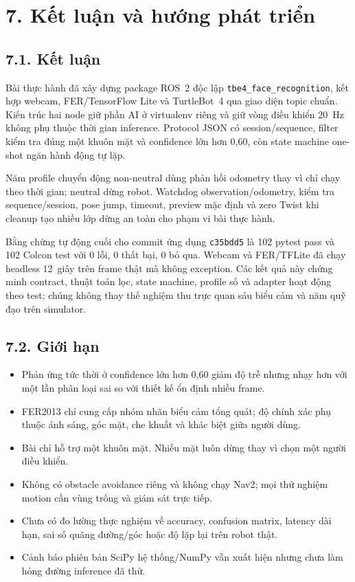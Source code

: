 \clearpage
\section*{7. Kết luận và hướng phát triển}

\subsection*{7.1. Kết luận}

Bài thực hành đã xây dựng package ROS~2 độc lập
\texttt{tbe4\_face\_recognition}, kết hợp webcam, FER/TensorFlow Lite và
TurtleBot~4 qua giao diện topic chuẩn. Kiến trúc hai node giữ phần AI ở
virtualenv riêng và giữ vòng điều khiển 20~Hz không phụ thuộc thời gian
inference. Protocol JSON có session/sequence, filter kiểm tra đúng một khuôn
mặt và confidence lớn hơn 0,60, còn state machine one-shot ngăn hành động tự
lặp.

Năm profile chuyển động non-neutral dùng phản hồi odometry thay vì chỉ chạy
theo thời gian; neutral dừng robot. Watchdog observation/odometry, kiểm tra
sequence/session, pose jump, timeout, preview mặc định và zero Twist khi
cleanup tạo nhiều lớp dừng an toàn cho phạm vi bài thực hành.

Bằng chứng tự động cuối cho commit ứng dụng \texttt{c35bdd5} là 102 pytest
pass và 102 Colcon test với 0 lỗi, 0 thất bại, 0 bỏ qua. Webcam và FER/TFLite
đã chạy headless 12~giây trên frame thật mà không exception. Các kết quả này
chứng minh contract, thuật toán lọc, state machine, profile số và adapter hoạt
động theo test; chúng không thay thế nghiệm thu trực quan sáu biểu cảm và năm
quỹ đạo trên simulator.

\subsection*{7.2. Giới hạn}

\begin{itemize}[leftmargin=1cm,itemsep=0.2em]
  \item Phản ứng tức thời ở confidence lớn hơn 0,60 giảm độ trễ nhưng nhạy hơn
        với một lần phân loại sai so với thiết kế ổn định nhiều frame.
  \item FER2013 chỉ cung cấp nhóm nhãn biểu cảm tổng quát; độ chính xác phụ
        thuộc ánh sáng, góc mặt, che khuất và khác biệt giữa người dùng.
  \item Bài chỉ hỗ trợ một khuôn mặt. Nhiều mặt luôn dừng thay vì chọn một
        người điều khiển.
  \item Không có obstacle avoidance riêng và không chạy Nav2; mọi thử nghiệm
        motion cần vùng trống và giám sát trực tiếp.
  \item Chưa có đo lường thực nghiệm về accuracy, confusion matrix, latency
        dài hạn, sai số quãng đường/góc hoặc độ lặp lại trên robot thật.
  \item Cảnh báo phiên bản SciPy hệ thống/NumPy vẫn xuất hiện nhưng chưa làm
        hỏng đường inference đã thử.
\end{itemize}

